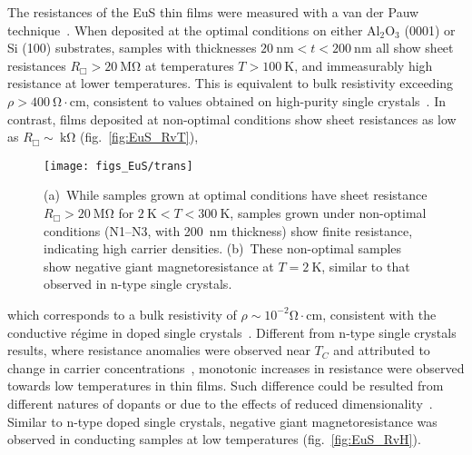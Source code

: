 The resistances of the EuS thin films were measured with a van der Pauw technique~\cite{VdP1958}. When deposited at the optimal conditions on either Al$_2$O$_3$ (0001) or Si (100) substrates, samples with thicknesses $20~\mathrm{nm}<t<200~\mathrm{nm}$ all show sheet resistances $R_\Box>20~\mathrm{M\Omega}$ at temperatures $T > 100~\mathrm{K}$, and immeasurably  high resistance at lower temperatures. This is equivalent to bulk resistivity exceeding  $\rho>400~\mathrm{\Omega\cdot{}cm}$, consistent to values obtained on high-purity single crystals~\cite{EuS_Shafer}. In contrast, films deposited at non-optimal conditions show sheet resistances as low as $R_\Box\sim~\mathrm{k\Omega}$ (fig.~\ref{fig:EuS_RvT}), %
%
\begin{figure}[ht]%
\subfloat{\label{fig:EuS_RvT}}%
\subfloat{\label{fig:EuS_RvH}}%
\centering%
\texttt{[image: figs\_EuS/trans]}%
\caption[Electrical properties of EuS thin films]{(a)~While samples grown at optimal conditions have sheet resistance $R_\Box>20~\mathrm{M\Omega}$ for $2~\mathrm{K}<T<300~\mathrm{K}$, samples grown under non-optimal conditions (N1--N3, with 200~nm thickness) show finite resistance, indicating high carrier densities. (b)~These non-optimal samples show negative giant magnetoresistance at $T=2~\mathrm{K}$, similar to that observed in n-type single crystals.}%
\label{fig:EuS_transport}
\end{figure}%
%
which corresponds to a bulk resistivity of $\rho\sim10^{-2}\mathrm{\Omega\cdot{}cm}$, consistent with the conductive r\'egime in doped single crystals~\cite{EuS_ntype}. Different from n-type single crystals results, where resistance anomalies were observed near $T_C$ and attributed to change in carrier concentrations~\cite{EuS_ntype, EuX_doped_transport}, monotonic increases in resistance were observed towards low temperatures in thin films. Such difference could be resulted from different natures of dopants or due to the effects of reduced dimensionality~\cite{2D_conduction}. Similar to n-type doped single crystals, negative giant magnetoresistance was observed in conducting samples at low temperatures (fig.~\ref{fig:EuS_RvH}).

